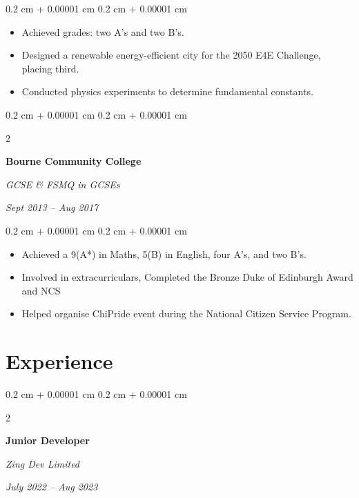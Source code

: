 \documentclass[10pt, letterpaper]{article}
\newenvironment{highlights}{
    \begin{itemize}[
        topsep=0.10 cm,
        parsep=0.10 cm,
        partopsep=0pt,
        itemsep=0pt,
        leftmargin=0.4 cm + 10pt
    ]
}{
    \end{itemize}
} %
\newenvironment{onecolentry}{
    \begin{adjustwidth}{
        0.2 cm + 0.00001 cm
    }{
        0.2 cm + 0.00001 cm
    }
}{
    \end{adjustwidth}
} %
\newenvironment{twocolentry}[2][]{
    \onecolentry
    \def\secondColumn{#2}
    \setcolumnwidth{\fill, 4.5 cm}
    \begin{paracol}{2}
}{
    \switchcolumn \raggedleft \secondColumn
    \end{paracol}
    \endonecolentry
} %
\begin{document}
        \vspace{0.10 cm}
        \begin{onecolentry}
            \begin{highlights}
                \item Achieved grades: two A's and two B's.
                \item Designed a renewable energy-efficient city for the 2050 E4E Challenge, placing third.
                \item Conducted physics experiments to determine fundamental constants.
            \end{highlights}
        \end{onecolentry}


        \vspace{0.2 cm}

        \begin{twocolentry}{
            
            
        \textit{Sept 2013 – Aug 2017}}
            \textbf{Bourne Community College}

            \textit{GCSE \& FSMQ in GCSEs}
        \end{twocolentry}

        \vspace{0.10 cm}
        \begin{onecolentry}
            \begin{highlights}
                \item Achieved a 9(A*) in Maths, 5(B) in English, four A's, and two B's.
                \item Involved in extracurriculars, Completed the Bronze Duke of Edinburgh Award and NCS
                \item Helped organise ChiPride event during the National Citizen Service Program.
            \end{highlights}
        \end{onecolentry}



    
    \section{Experience}



        
        \begin{twocolentry}{
            
            
        \textit{July 2022 – Aug 2023}}
            \textbf{Junior Developer}
            
            \textit{Zing Dev Limited}
        \end{twocolentry}
\end{document}
